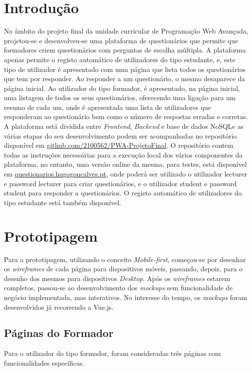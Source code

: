 \documentclass[12pt,a4paper,final]{article}
\begin{document}
    \section{Introdução}\label{sec:introducao}
    No âmbito do projeto final da unidade curricular de Programação Web Avançada, projetou-se e desenvolveu-se uma plataforma de questionários que permite que formadores criem questionários com perguntas de escolha múltipla.
    A plataforma apenas permite o registo automático de utilizadores do tipo estudante, e, este tipo de utilizador é apresentado com uma página que lista todos os questionários que tem por responder.
    Ao responder a um questionário, o mesmo desaparece da página inicial.
    Ao utilizador do tipo formador, é apresentado, na página inicial, uma listagem de todos os seus questionários, oferecendo uma ligação para um resumo de cada um, onde é apresentada uma lista de utilizadores que responderam ao questionário bem como o número de respostas erradas e corretas.
    A plataforma está dividida entre \textit{Frontend}, \textit{Backend} e base de dados NoSQL\@ e as várias etapas do seu desenvolvimento podem ser acompanhadas no repositório disponível em \href{https://github.com/2100562/PWA-ProjetoFinal}{github.com/2100562/PWA-ProjetoFinal}.
    O repositório contem todas as instruções necessárias para a execução local dos vários componentes da plataforma, no entanto, uma versão online da mesma, para testes, está disponível em \href{https://questionarios.hugogoncalves.pt}{questionarios.hugogoncalves.pt}, onde poderá ser utilizado o utilizador lecturer e password lecturer para criar questionários, e o utilizador student e password student para responder a questionários.
    O registo automático de utilizadores do tipo estudante está também disponível.


    \section{Prototipagem}\label{sec:prototipagem}
    Para a prototipagem, utilizando o conceito \textit{Mobile-first}, começou-se por desenhar os \textit{wireframes} de cada página para dispositivos móveis, passando, depois, para o desenho dos mesmos para dispositivos \textit{Desktop}.
    Após os \textit{wireframes} estarem completos, passou-se ao desenvolvimento dos \textit{mockups} sem funcionalidade de negócio implementada, mas interativos.
    No interesse do tempo, os \textit{mockups} foram desenvolvidos já recorrendo a Vue.js.

    \subsection{Páginas do Formador}\label{subsec:paginas-do-formador}
    Para o utilizador do tipo formador, foram consideradas três páginas com funcionalidades específicas.
\end{document}
